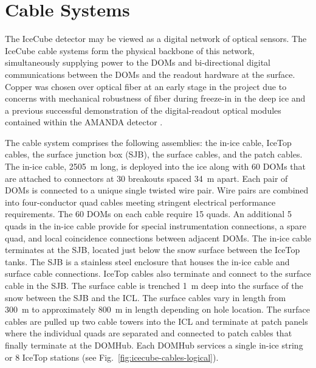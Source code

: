 
 
\section{\label{sec:cable}Cable Systems}

The IceCube detector may be viewed as a digital network of optical
sensors. The IceCube cable systems form the physical backbone of this
network, simultaneously supplying power to the DOMs and bi-directional
digital communications between the DOMs and the readout hardware at the
surface. Copper was chosen over optical fiber at an early stage in the
project due to concerns with mechanical robustness of fiber during
freeze-in in the deep ice and a previous successful demonstration of the
digital-readout optical modules contained within the AMANDA detector
\cite{AMANDA:string18}. 

The cable system comprises the following assemblies: the in-ice cable,
IceTop cables, the surface junction box (SJB), the surface cables, and the patch
cables. The in-ice cable, 2505~m long, is deployed
into the ice along with 60 DOMs that are attached to connectors at 30
breakouts spaced 34~m apart. Each pair of DOMs is connected to a unique
single twisted wire pair. Wire pairs are combined into four-conductor quad
cables meeting stringent electrical performance requirements. The 60
DOMs on each cable require 15 quads. An additional 5 quads in the
in-ice cable provide for special instrumentation connections, a spare quad,
and local coincidence connections between adjacent DOMs. The in-ice
cable terminates at the SJB, located just below the snow surface between
the IceTop tanks. The SJB is a stainless steel
enclosure that houses the in-ice cable and surface cable
connections. IceTop cables also terminate and connect to the surface cable
in the SJB. The surface cable is trenched 1~m deep into the
surface of the snow between the SJB and the ICL. The surface
cables vary in length from 300~m to approximately 800~m in length depending on hole location. The surface cables are
pulled up two cable towers into the ICL and terminate at patch panels where the individual
quads are separated and connected to patch cables that finally terminate at the DOMHub. Each
DOMHub services a single in-ice string or 8 IceTop stations (see
Fig.~\ref{fig:icecube-cables-logical}). 

